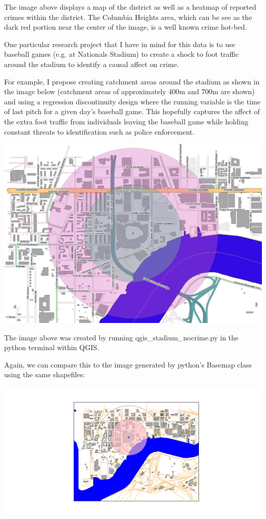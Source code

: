\documentclass{article}
\begin{document}
The image above displays a map of the district as well as a heatmap of reported crimes within the district. The Columbia Heights area, which can be see as the dark red portion near the center of the image, is a well known crime hot-bed.

\newpage

One particular research project that I have in mind for this data is to use baseball games (e.g. at Nationals Stadium) to create a shock to foot traffic around the stadium to identify a causal affect on crime.

For example, I propose creating catchment areas around the stadium as shown in the image below (catchment areas of approximately 400m and 700m are shown) and using a regression discontinuity design where the running variable is the time of last pitch for a given day's baseball game. This hopefully captures the affect of the extra foot traffic from individuals leaving the baseball game while holding constant threats to identification such as police enforcement.

\includegraphics[scale = .45]{Stadium_nocrime} 

The image above was created by running qgis\_stadium\_nocrime.py in the python terminal within QGIS.

\newpage
Again, we can compare this to the image generated by python's Basemap class using the same shapefiles:


\includegraphics[scale = .45]{python_stadium}
\end{document}
